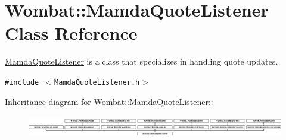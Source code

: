 \hypertarget{classWombat_1_1MamdaQuoteListener}{
\section{Wombat::Mamda\-Quote\-Listener Class Reference}
\label{classWombat_1_1MamdaQuoteListener}
}
\hyperlink{classWombat_1_1MamdaQuoteListener}{Mamda\-Quote\-Listener} is a class that specializes in handling quote updates.  


{\tt \#include $<$Mamda\-Quote\-Listener.h$>$}

Inheritance diagram for Wombat::Mamda\-Quote\-Listener::\begin{figure}[H]
\begin{center}
\leavevmode
\includegraphics[height=0.979592cm]{classWombat_1_1MamdaQuoteListener}
\end{center}
\end{figure}
